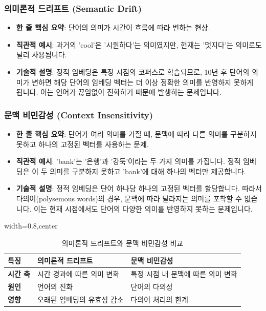 \documentclass[11pt,a4paper]{article}
\theoremstyle{definition}
\begin{document}
\subsubsection{의미론적 드리프트 (Semantic Drift)}
\begin{itemize}
    \item \textbf{한 줄 핵심 요약}: 단어의 의미가 시간이 흐름에 따라 변하는 현상.
    \item \textbf{직관적 예시}: 과거의 'cool'은 '시원하다'는 의미였지만, 현재는 '멋지다'는 의미로도 널리 사용됩니다.
    \item \textbf{기술적 설명}: 정적 임베딩은 특정 시점의 코퍼스로 학습되므로, 10년 후 단어의 의미가 변하면 해당 단어의 임베딩 벡터는 더 이상 정확한 의미를 반영하지 못하게 됩니다. 이는 언어가 끊임없이 진화하기 때문에 발생하는 문제입니다.
\end{itemize}

\subsubsection{문맥 비민감성 (Context Insensitivity)}
\begin{itemize}
    \item \textbf{한 줄 핵심 요약}: 단어가 여러 의미를 가질 때, 문맥에 따라 다른 의미를 구분하지 못하고 하나의 고정된 벡터를 사용하는 문제.
    \item \textbf{직관적 예시}: 'bank'는 '은행'과 '강둑'이라는 두 가지 의미를 가집니다. 정적 임베딩은 이 두 의미를 구분하지 못하고 'bank'에 대해 하나의 벡터만 제공합니다.
    \item \textbf{기술적 설명}: 정적 임베딩은 단어 하나당 하나의 고정된 벡터를 할당합니다. 따라서 다의어(polysemous words)의 경우, 문맥에 따라 달라지는 의미를 포착할 수 없습니다. 이는 현재 시점에서도 단어의 다양한 의미를 반영하지 못하는 문제입니다.
\end{itemize}

\begin{table}[h!]
\centering
\caption{의미론적 드리프트와 문맥 비민감성 비교}
\label{tab:drift_vs_insensitivity}
\begin{adjustbox}{width=0.8\textwidth,center}
\begin{tabular}{lll}
\toprule
\textbf{특징} & \textbf{의미론적 드리프트} & \textbf{문맥 비민감성} \\
\midrule
\textbf{시간 축} & 시간 경과에 따른 의미 변화 & 특정 시점 내 문맥에 따른 의미 변화 \\
\textbf{원인} & 언어의 진화 & 단어의 다의성 \\
\textbf{영향} & 오래된 임베딩의 유효성 감소 & 다의어 처리의 한계 \\
\bottomrule
\end{tabular}
\end{adjustbox}
\end{table}
\end{document}
